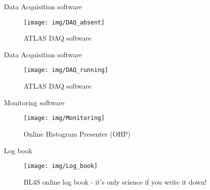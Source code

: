 \documentclass[9pt]{beamer}
\begin{document}
\begin{frame}{Data Acquisition software}
\vspace*{-1cm}
\begin{figure}\texttt{[image: img/DAQ\_absent]}\vspace*{-0.2cm}\caption{ATLAS DAQ software}\end{figure}\vspace*{-1cm}
\end{frame}

\begin{frame}{Data Acquisition software}
\vspace*{-1cm}
\begin{figure}\texttt{[image: img/DAQ\_running]}\vspace*{-0.2cm}\caption{ATLAS DAQ software}\end{figure}\vspace*{-1cm}
\end{frame}

\begin{frame}{Monitoring software}
\vspace*{-0.5cm}
\begin{figure}\texttt{[image: img/Monitoring]}\vspace*{-0.2cm}\caption{Online Histogram Presenter (OHP)}\end{figure}\vspace*{-1cm}
\end{frame}

\begin{frame}{Log book}
\vspace*{-1cm}
\begin{figure}\texttt{[image: img/Log\_book]}\vspace*{-0.2cm}\caption{BL4S online log book - it's only science if you write it down!}\end{figure}\vspace*{-1cm}
\end{frame}
\end{document}

